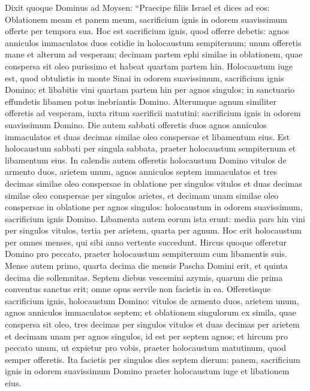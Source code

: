 \begin{biblechapter}  
\verse Dixit quoque Dominus ad Moysen: 
\verse “Praecipe filiis Israel et dices ad eos: Oblationem meam et panem meum, sacrificium ignis in odorem suavissimum offerte per tempora sua. 
\verse Hoc est sacrificium ignis, quod offerre debetis: agnos anniculos immaculatos duos cotidie in holocaustum sempiternum; 
\verse unum offeretis mane et alterum ad vesperam; 
\verse decimam partem ephi similae in oblationem, quae conspersa sit oleo purissimo et habeat quartam partem hin. 
\verse Holocaustum iuge est, quod obtulistis in monte Sinai in odorem suavissimum, sacrificium ignis Domino; 
\verse et libabitis vini quartam partem hin per agnos singulos; in sanctuario effundetis libamen potus inebriantis Domino. 
\verse Alterumque agnum similiter offeretis ad vesperam, iuxta ritum sacrificii matutini: sacrificium ignis in odorem suavissimum Domino. 
\verse Die autem sabbati offeretis duos agnos anniculos immaculatos et duas decimas similae oleo conspersae et libamentum eius. 
\verse Est holocaustum sabbati per singula sabbata, praeter holocaustum sempiternum et libamentum eius. 
\verse In calendis autem offeretis holocaustum Domino vitulos de armento duos, arietem unum, agnos anniculos septem immaculatos 
\verse et tres decimas similae oleo conspersae in oblatione per singulos vitulos et duas decimas similae oleo conspersae per singulos arietes, 
\verse et decimam unam similae oleo conspersae in oblatione per agnos singulos: holocaustum in odorem suavissimum, sacrificium ignis Domino. 
\verse Libamenta autem eorum ista erunt: media pars hin vini per singulos vitulos, tertia per arietem, quarta per agnum. Hoc erit holocaustum per omnes menses, qui sibi anno vertente succedunt. 
\verse Hircus quoque offeretur Domino pro peccato, praeter holocaustum sempiternum cum libamentis suis. 
\verse Mense autem primo, quarta decima die mensis Pascha Domini erit, 
\verse et quinta decima die sollemnitas. Septem diebus vescemini azymis, 
\verse quarum die prima conventus sanctus erit; omne opus servile non facietis in ea. 
\verse Offeretisque sacrificium ignis, holocaustum Domino: vitulos de armento duos, arietem unum, agnos anniculos immaculatos septem; 
\verse et oblationem singulorum ex simila, quae conspersa sit oleo, tres decimas per singulos vitulos et duas decimas per arietem 
\verse et decimam unam per agnos singulos, id est per septem agnos; 
\verse et hircum pro peccato unum, ut expietur pro vobis,  
\verse praeter holocaustum matutinum, quod semper offeretis. 
\verse Ita facietis per singulos dies septem dierum: panem, sacrificium ignis in odorem suavissimum Domino praeter holocaustum iuge et libationem eius. 

\end{biblechapter}
